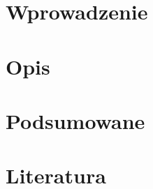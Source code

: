 \documentclass[a4paper, 12pt]{article}
\begin{document}
  

  \leavevmode\thispagestyle{empty}\newpage %


  \tableofcontents
  \section{Wprowadzenie}
  \section{Opis}
  \section{Podsumowane}
  \section{Literatura}
\end{document}
